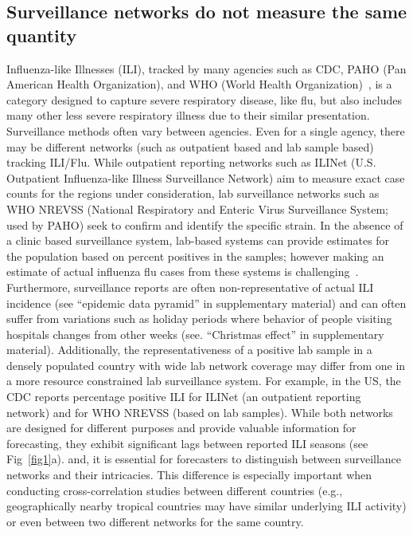 \documentclass[10pt,letterpaper]{article}
\newcommand{\narenc}[1]{{\color{black}\textrm{#1}}}
\begin{document}
\subsection*{Surveillance networks do not measure the same quantity}
Influenza-like Illnesses (ILI), tracked by many agencies such as CDC, PAHO (Pan American
Health Organization), and
WHO (World Health Organization)~\cite{cdc,paho,who}, is a category designed to capture severe respiratory
disease, like flu, but also includes many other less severe
respiratory illness due to their similar presentation. Surveillance methods
often vary between agencies. Even for a single agency, there may be different
networks (such as outpatient based and lab sample based) tracking ILI/Flu.
While outpatient reporting networks such as ILINet (U.S. Outpatient Influenza-like Illness 
Surveillance Network) aim to measure exact case
counts for the regions under consideration, lab surveillance networks such as
WHO NREVSS (National Respiratory and Enteric Virus Surveillance System;
used by PAHO) seek to confirm and identify the specific strain.  In
the absence of a clinic based surveillance system, lab-based systems can
provide estimates for the population based on percent positives in the samples;
however making an estimate of actual influenza flu cases from these systems is challenging~\cite{cdc}.
Furthermore, surveillance reports are often non-representative of actual ILI
incidence (\narenc{see ``epidemic data pyramid'' in supplementary material})
and can often suffer from variations such as holiday periods where behavior of
people visiting hospitals changes from other weeks (see.  ``Christmas effect''
in supplementary material).
Additionally, the representativeness of a positive lab sample
in a densely populated country with wide lab network coverage may
differ from one in a more resource constrained lab surveillance system. For
example, in the US, the CDC reports percentage positive ILI for ILINet (an
outpatient reporting network) and for WHO NREVSS (based on lab samples). While
both networks are designed for different purposes and provide valuable
information for forecasting, they exhibit significant lags between reported ILI seasons (see
Fig~\ref{fig1}a).  and, it is essential for forecasters to distinguish between
surveillance networks and their intricacies.  This difference is especially
important when conducting cross-correlation studies between different countries
(e.g., geographically nearby tropical countries may have similar underlying ILI
activity) or even between two different networks for the same country.
\end{document}
